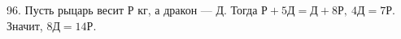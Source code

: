 96. Пусть рыцарь весит Р кг, а дракон --- Д. Тогда $\text{Р}+5\text{Д}=\text{Д}+8\text{Р},\ 4\text{Д}=7\text{Р}.$ Значит, $8\text{Д}=14\text{Р}.$\\

